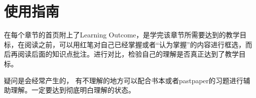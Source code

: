 
\chapter{使用指南}
\label{user guide}
在每个章节的首页附上了Learning Outcome，是学完该章节所需要达到的教学目标，在阅读之前，可以用红笔对自己已经掌握或者``认为掌握''的内容进行框选，而后再阅读后面的知识点批注。进行对比，检验自己的理解是否真正达到了教学目标。

疑问是会经常产生的， 有不理解的地方可以配合书本或者pastpaper的习题进行辅助理解。一定要达到彻底明白理解的状态。
